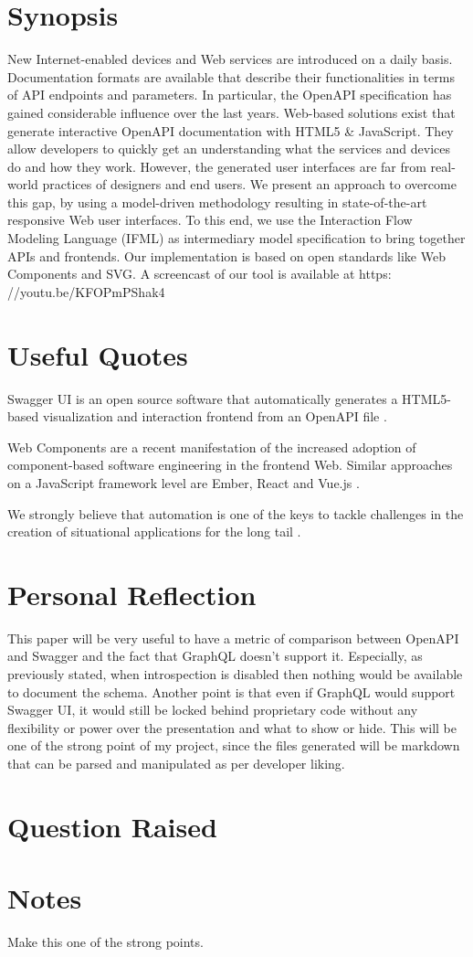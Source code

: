 \section{Synopsis}
\label{s:Synopsis-3}
New Internet-enabled devices and Web services are introduced on a daily basis.
Documentation formats are available that describe their functionalities in terms
of API endpoints and parameters. In particular, the OpenAPI specification has
gained considerable influence over the last years. Web-based solutions exist
that generate interactive OpenAPI documentation with HTML5 \& JavaScript. They
allow developers to quickly get an understanding what the services and devices
do and how they work. However, the generated user interfaces are far from
real-world practices of designers and end users. We present an approach to
overcome this gap, by using a model-driven methodology resulting in
state-of-the-art responsive Web user interfaces. To this end, we use the
Interaction Flow Modeling Language (IFML) as intermediary model specification to
bring together APIs and frontends. Our implementation is based on open standards
like Web Components and SVG\@. A screencast of our tool is available at https:
//youtu.be/KFOPmPShak4

\section{Useful Quotes}
\label{s:Useful-Quotes-3}
Swagger UI is an open source software that automatically generates a
HTML5-based visualization and interaction frontend from an OpenAPI file \citep{
korenExploitationOpenAPIDocumentation2018}.

Web Components are a recent manifestation of the increased adoption of
component-based software engineering in the frontend Web. Similar approaches on
a JavaScript framework level are Ember, React and Vue.js \citep{
korenExploitationOpenAPIDocumentation2018}.

We strongly believe that automation is one of the keys to tackle challenges in
the creation of situational applications for the long tail \citep{
korenExploitationOpenAPIDocumentation2018}.

\section{Personal Reflection}
\label{s:Personal-Reflection-3}
This paper will be very useful to have a metric of comparison between OpenAPI and Swagger and the
fact that GraphQL doesn't support it. Especially, as previously stated, when introspection is disabled
then nothing would be available to document the schema.
Another point is that even if GraphQL would support Swagger UI, it would still be locked behind proprietary code
without any flexibility or power over the presentation and what to show or hide.
This will be one of the strong point of my project, since the files generated will be markdown
that can be parsed and manipulated as per developer liking.

\section{Question Raised}
\label{s:Question-Raised-3}

\section{Notes}
\label{s:Notes-3}
Make this one of the strong points.

